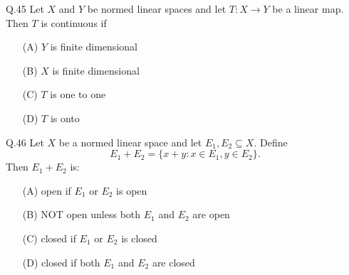 \documentclass{article}
\begin{document}
																																																																		     Q.45 \quad Let $X$ and $Y$ be normed linear spaces and let $T: X \to Y$ be a linear map. Then $T$ is continuous if
																																																																		         \begin{itemize}
																																																																			         \item[(A)] $Y$ is finite dimensional
																																																																				         \item[(B)] $X$ is finite dimensional
																																																																					         \item[(C)] $T$ is one to one
																																																																						         \item[(D)] $T$ is onto
																																																																							     \end{itemize}
																																																																							         \newpage
																																																																								 Q.46 \quad Let $X$ be a normed linear space and let $E_1, E_2 \subseteq X$. Define
																																																																								     \[
																																																																								         E_1 + E_2 = \{x + y : x \in E_1, y \in E_2\}.
																																																																									     \]
																																																																									         Then $E_1 + E_2$ is:
																																																																										     \begin{itemize}
																																																																										             
																																																																											             \item[(A)] open if $E_1$ or $E_2$ is open
																																																																												             \item[(B)] NOT open unless both $E_1$ and $E_2$ are open
																																																																													             \item[(C)] closed if $E_1$ or $E_2$ is closed
																																																																														             \item[(D)] closed if both $E_1$ and $E_2$ are closed
																																																																															         \end{itemize}
\end{document}
